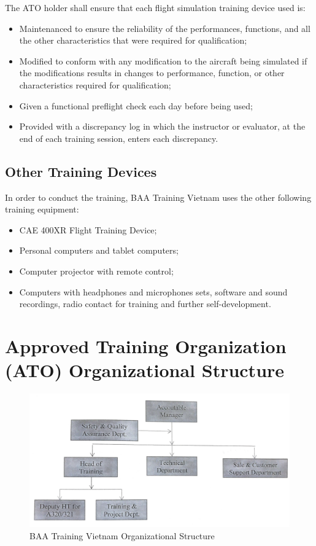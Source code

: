             The ATO holder shall ensure that each flight simulation training device used is:
            \begin{itemize}
                \item Maintenanced to ensure the reliability of the performances, functions, and all the other characteristics that were required for qualification;
                \item Modified to conform with any modification to the aircraft being simulated if the modifications results in changes to performance, function, or 
                other characteristics required for qualification;
                \item Given a functional preflight check each day before being used;
                \item Provided with a discrepancy log in which the instructor or evaluator, at the end of each training session, enters each discrepancy.
            \end{itemize}
    \subsection{Other Training Devices}
        In order to conduct the training, BAA Training Vietnam uses the other following training equipment:
        \begin{itemize}
            \item CAE 400XR Flight Training Device;
            \item Personal computers and tablet computers;
            \item Computer projector with remote control;
            \item Computers with headphones and microphones sets, software and sound recordings, radio contact for training and further self-development.
        \end{itemize}

\section{Approved Training Organization (ATO) Organizational Structure}
    \begin{figure}[H]
        \centering
        \includegraphics[width=0.6\linewidth]{img/structure.jpg}
        \caption{BAA Training Vietnam Organizational Structure}
    \end{figure}
